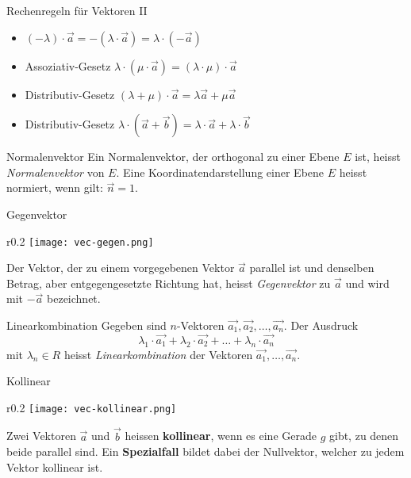 \begin{theorem}{Rechenregeln für Vektoren II}
    \begin{itemize}
        \item $(-\lambda)\cdot\vec{a}=-(\lambda\cdot\vec{a})=\lambda\cdot(-\vec{a})$
        \item Assoziativ-Gesetz $\lambda\cdot(\mu\cdot\vec{a})=(\lambda\cdot\mu)\cdot\vec{a}$ 
        \item Distributiv-Gesetz $(\lambda+\mu)\cdot\vec{a}=\lambda\vec{a}+\mu\vec{a}$
        \item Distributiv-Gesetz $\lambda\cdot(\vec{a}+\vec{b})=\lambda\cdot\vec{a}+\lambda\cdot\vec{b}$
    \end{itemize}
\end{theorem}

\begin{definition}{Normalenvektor}
    Ein Normalenvektor, der orthogonal zu einer Ebene $E$ ist, heisst \textit{Normalenvektor} von $E$.
    Eine Koordinatendarstellung einer Ebene $E$ heisst normiert, wenn gilt: $\vec{n}=1$.
\end{definition}

\begin{definition}{Gegenvektor}
    \begin{wrapfigure}{r}{0.2\textwidth}
        \vspace{-10pt}
        \texttt{[image: vec-gegen.png]}
    \end{wrapfigure}
    Der Vektor, der zu einem vorgegebenen Vektor $\vec{a}$ parallel ist und denselben Betrag,
    aber entgegengesetzte Richtung hat, heisst \textit{Gegenvektor} zu $\vec{a}$ und wird mit $-\vec{a}$ bezeichnet.
\end{definition}

\begin{definition}{Linearkombination}
    Gegeben sind $n$-Vektoren $\vec{a_1},\vec{a_2},\ldots,\vec{a_n}$.
    Der Ausdruck
    \begin{equation*}
        \lambda_1\cdot\vec{a_1}+\lambda_2\cdot\vec{a_2}+\ldots+\lambda_n\cdot\vec{a_n}
    \end{equation*}
    mit $\lambda_n\in R$ heisst \textit{Linearkombination} der Vektoren $\vec{a_1},\ldots,\vec{a_n}$.
\end{definition}

\begin{definition}{Kollinear}
    \begin{wrapfigure}{r}{0.2\textwidth}
        \vspace{-10pt}
        \texttt{[image: vec-kollinear.png]}
    \end{wrapfigure}
    Zwei Vektoren $\vec{a}$ und $\vec{b}$ heissen \textbf{kollinear}, 
    wenn es eine Gerade $g$ gibt, zu denen beide parallel sind. 
    Ein \textbf{Spezialfall} bildet dabei der Nullvektor, welcher zu jedem Vektor kollinear ist.
\end{definition}

